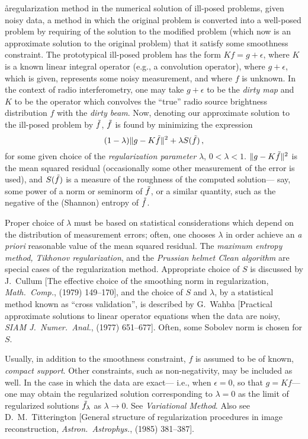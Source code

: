\aa{regularization method}
in the numerical solution of ill-posed problems, given noisy data,
a method in which the original problem is converted into
a well-posed problem by requiring of the solution
to the modified problem (which now is an approximate solution to
the original problem)
that it satisfy some smoothness constraint.
The prototypical ill-posed problem has the form
$Kf=g+\epsilon$, where $K$ is a known linear integral operator (e.g., a
convolution operator), where $g+\epsilon$,
which is given, represents some noisy measurement,
and where $f$ is unknown.
In the context of radio interferometry, one may take $g+\epsilon$
to be the {\it dirty map} and $K$ to be the operator which
convolves the ``true'' radio source brightness distribution $f$
with the {\it dirty beam}.
Now, denoting our approximate solution to the ill-posed
problem by $\tilde f$, $\tilde f$ is found by minimizing the expression
$$(1-\lambda)\|g-K\tilde f\|^2+\lambda S(\tilde f)\,,$$
for some given choice of the {\it regularization parameter}
$\lambda$, $0<\lambda<1$.
$\|g-K\tilde f\|^2$ is the mean squared residual (occasionally
some other measurement of the error is used), and $S(\tilde f)$ is
a measure of the roughness of the computed solution---%
say, some power of a norm or seminorm of $\tilde f$, or a similar quantity,
such as the negative of the (Shannon) entropy of $\tilde f$.
\par
Proper choice of $\lambda$ must be based on statistical
considerations which depend on the distribution of measurement
errors; often, one chooses $\lambda$ in order
achieve an {\it a priori} reasonable value of the mean squared residual.
The {\it maximum entropy method, Tikhonov regularization}, and
the {\it Prussian helmet Clean algorithm}
are special cases of the regularization method.
Appropriate choice of $S$ is discussed by J.~Cullum
[The effective choice of the smoothing norm in
regularization, {\it Math.\ Comp.},  (1979) 149--170],
and the choice of $S$ and $\lambda$, by a statistical method known
as ``cross validation'', is described by G.~Wahba
[Practical approximate solutions to linear operator
equations when the data are noisy, {\it SIAM J.\ Numer.\ Anal.},
 (1977) 651--677].
Often, some Sobolev norm is chosen for $S$.
\par
Usually, in addition to the smoothness constraint, $f$ is assumed
to be of known, {\it compact support}.
Other constraints, such as non-negativity, may be included as well.
In the case in which the data are exact---%
i.e., when $\epsilon=0$, so that $g=Kf$---%
one may obtain the regularized solution corresponding to $\lambda=0$
as the limit of regularized solutions $\tilde f_\lambda$ as $\lambda\to0$.
See {\it Variational Method}.
Also see D.~M.~Titterington [General structure of regularization
procedures in image reconstruction, {\it Astron.\ Astrophys.},
 (1985) 381--387].

